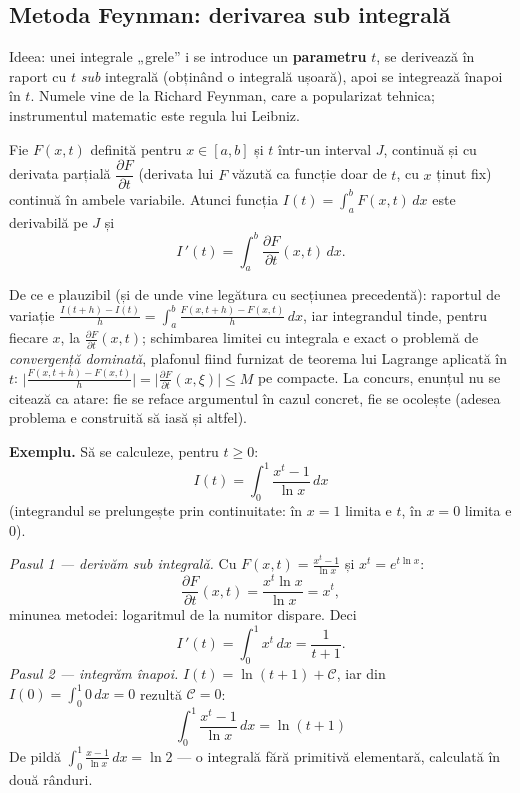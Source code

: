 \subsection{Metoda Feynman: derivarea sub integrală}

Ideea: unei integrale „grele'' i se introduce un \textbf{parametru} $t$, se derivează în raport cu $t$ \emph{sub} integrală (obținând o integrală ușoară), apoi se integrează înapoi în $t$. Numele vine de la Richard Feynman, care a popularizat tehnica; instrumentul matematic este regula lui Leibniz.

\begin{teorema}
Fie $F(x,t)$ definită pentru $x\in[a,b]$ și $t$ într-un interval $J$, continuă și cu derivata parțială $\dfrac{\partial F}{\partial t}$ (derivata lui $F$ văzută ca funcție doar de $t$, cu $x$ ținut fix) continuă în ambele variabile. Atunci funcția $I(t)=\displaystyle\int_a^b F(x,t)\,dx$ este derivabilă pe $J$ și
\[
I\,'(t)=\int_a^b\frac{\partial F}{\partial t}(x,t)\,dx.
\]
\end{teorema}

\begin{obs}
De ce e plauzibil (și de unde vine legătura cu secțiunea precedentă): raportul de variație
$\frac{I(t+h)-I(t)}{h}=\int_a^b\frac{F(x,t+h)-F(x,t)}{h}\,dx$, iar integrandul tinde, pentru fiecare $x$, la $\frac{\partial F}{\partial t}(x,t)$; schimbarea limitei cu integrala e exact o problemă de \emph{convergență dominată}, plafonul fiind furnizat de teorema lui Lagrange aplicată în $t$: $\big|\frac{F(x,t+h)-F(x,t)}{h}\big|=\big|\frac{\partial F}{\partial t}(x,\xi)\big|\le M$ pe compacte. La concurs, enunțul nu se citează ca atare: fie se reface argumentul în cazul concret, fie se ocolește (adesea problema e construită să iasă și altfel).
\end{obs}

\textbf{Exemplu.} Să se calculeze, pentru $t\ge0$:
\[
I(t)=\int_0^1\frac{x^{t}-1}{\ln x}\,dx
\]
(integrandul se prelungește prin continuitate: în $x=1$ limita e $t$, în $x=0$ limita e $0$).

\emph{Pasul 1 --- derivăm sub integrală.} Cu $F(x,t)=\frac{x^t-1}{\ln x}$ și $x^t=e^{t\ln x}$:
\[
\frac{\partial F}{\partial t}(x,t)=\frac{x^{t}\ln x}{\ln x}=x^{t},
\]
minunea metodei: logaritmul de la numitor dispare. Deci
\[
I\,'(t)=\int_0^1 x^{t}\,dx=\frac{1}{t+1}.
\]
\emph{Pasul 2 --- integrăm înapoi.} $I(t)=\ln(t+1)+\mathcal C$, iar din $I(0)=\int_0^1 0\,dx=0$ rezultă $\mathcal C=0$:
\[
\boxed{\ \int_0^1\frac{x^t-1}{\ln x}\,dx=\ln(t+1)\ }
\]
De pildă $\int_0^1\frac{x-1}{\ln x}\,dx=\ln2$ --- o integrală fără primitivă elementară, calculată în două rânduri.

